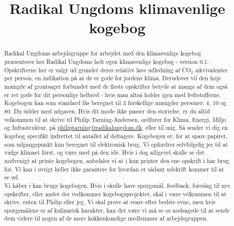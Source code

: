 \documentclass[11pt, a4paper]{article}
\newcommand{\coo}{CO$_2$ }
\begin{document}






\title{Radikal Ungdoms klimavenlige kogebog}
\author{}
\maketitle

\begin{abstract}
\noindent 	Radikal Ungdoms arbejdsgruppe for arbejdet med den klimavenlige kogebog præsenterer her Radikal Ungdoms helt egen klimavenlige kogebog - version 0.1. Opskrifterne her er valgt ud grundet deres relativt lave udledning af \coo ækvivalenter per person, en indikation på at de er gode for jordens klima. Derudover vil den høje mængde af grøntsager forbundet med de fleste opskrifter betyde at mange af dem også er ret gode for dit personlige helbred - hvis man altså holder igen med fedtstofferne.\\
	
\noindent	Kogebogen kan som standard fås beregnet til 3 forskellige mængder personer: 4, 10 og 80. Du sidder med \ruNumPersons{}  udgaven. Hvis dit møde ikke passer den størrelse, er du altid velkommen til at skrive til Philip Tarning-Andersen, ordfører for Klima, Energi, Miljø og Infrastruktur, på \href{mailto:philiptarning@radikalungdom.dk}{philiptarning@radikalungdom.dk}, eller til mig. Så sender vi dig en kogebog specifikt indrettet til antallet af deltagere. Kogebogen er, for at spare papiret, som udgangspunkt kun beregnet til elektronisk brug. Vi opfordrer selvfølgelig jer til at vælge klimaet først, og være med på den idé. Hvis i dog alligevel skulle se det nødvenigt at printe kogebogen, anbefaler vi at i kun printer den ene opskrift i har brug for. Vi kan i øvrigt heller ikke garantere for hvordan et sådant udskrift kommer til at se ud.\\
	
\noindent	Vi håber i kan bruge kogebogen. Hvis i skulle have spørgsmål, feedback, foreslag til nye opskrifter, eller andet der vedkommer kogebogsprojektet, skal i være velkommen til at skrive, enten til Philip eller jeg. Vi skal prøve at svare efter bedste evne, men hvis spørgsmålene er af kulinarisk karakter, kan det være vi må se os nødsagede til at sende dem videre til nogen af de mere køkkenkundige medlemmer af arbejdsgruppen.\\


\end{abstract}
\end{document}
